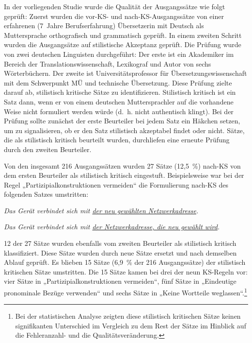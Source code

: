 In der vorliegenden Studie wurde die Qualität der Ausgangssätze wie folgt geprüft: Zuerst wurden die vor-KS- und nach-KS-Ausgangssätze von einer erfahrenen (7~Jahre Berufserfahrung) Übersetzerin mit Deutsch als Muttersprache orthografisch und grammatisch geprüft. In einem zweiten Schritt wurden die Ausgangsätze auf stilistische Akzeptanz geprüft. Die Prüfung wurde von zwei deutschen Linguisten durchgeführt: Der erste ist ein Akademiker im Bereich der Translationswissenschaft, Lexikograf und Autor von sechs Wörterbüchern. Der zweite ist Universitätsprofessor für Übersetzungswissenschaft mit dem Schwerpunkt MÜ und technische Übersetzung. Diese Prüfung zielte darauf ab, stilistisch kritische Sätze zu identifizieren. Stilistisch kritisch ist ein Satz dann, wenn er von einem deutschen Muttersprachler auf die vorhandene Weise nicht formuliert werden würde (d.~h. nicht authentisch klingt). Bei der Prüfung sollte zunächst der erste Beurteiler bei jedem Satz ein Häkchen setzen, um zu signalisieren, ob er den Satz stilistisch akzeptabel findet oder nicht. Sätze, die als stilistisch kritisch beurteilt wurden, durchliefen eine erneute Prüfung durch den zweiten Beurteiler.

Von den insgesamt 216 Ausgangssätzen wurden 27 Sätze (12,5~\%) nach-KS von dem ersten Beurteiler als stilistisch kritisch eingestuft. Beispielsweise war bei der Regel „Partizipialkonstruktionen vermeiden“ die Formulierung nach-KS des folgenden Satzes umstritten:

\begin{description}[font=\normalfont]
\item[Vor-KS:] \textit{Das Gerät verbindet sich mit \ul{der neu gewählten Netzwerkadresse}.}

\item[Nach-KS:] \textit{Das Gerät verbindet sich mit \ul{der Netzwerkadresse, die neu gewählt wird}.}
\end{description}

12 der 27 Sätze wurden ebenfalls vom zweiten Beurteiler als stilistisch kritisch klassifiziert. Diese Sätze wurden durch neue Sätze ersetzt und nach demselben Ablauf geprüft. Es blieben 15 Sätze (6,9~\% der 216 Ausgangssätze) der stilistisch kritischen Sätze umstritten. Die 15 Sätze kamen bei drei der neun KS-Regeln vor: vier Sätze in „Partizipialkonstruktionen vermeiden“, fünf Sätze in „Eindeutige pronominale Bezüge verwenden“ und sechs Sätze in „Keine Wortteile weglassen“.\footnote{{Bei der statistischen Analyse zeigten diese stilistisch kritischen Sätze keinen signifikanten Unterschied im Vergleich zu dem Rest der Sätze im Hinblick auf die Fehleranzahl- und die Qualitätsveränderung}{{{.}}}}

